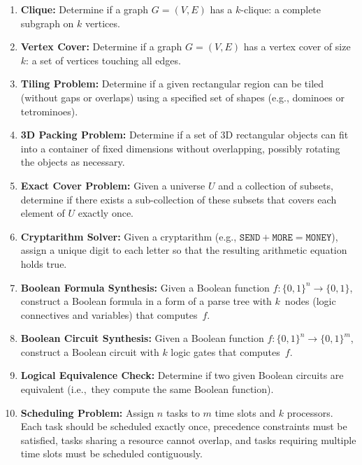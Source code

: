\documentclass[a4paper,12pt]{article}
\begin{document}
\begin{tasks}
\begin{enumerate}[start=0]
        \item \textbf{Clique:}
        Determine if a graph $G = (V, E)$ has a $k$-clique: a complete subgraph on $k$ vertices.

        \item \textbf{Vertex Cover:}
        Determine if a graph $G = (V, E)$ has a vertex cover of size~$k$: a set of vertices touching all edges.

        \item \textbf{Tiling Problem:}
        Determine if a given rectangular region can be tiled (without gaps or overlaps) using a specified set of shapes (e.g., dominoes or tetrominoes).

        \item \textbf{3D Packing Problem:}
        Determine if a set of 3D rectangular objects can fit into a container of fixed dimensions without overlapping, possibly rotating the objects as necessary.

        \item \textbf{Exact Cover Problem:}
        Given a universe $U$ and a collection of subsets, determine if there exists a sub-collection of these subsets that covers each element of $U$ exactly once.

        \item \textbf{Cryptarithm Solver:}
        Given a cryptarithm (e.g., $\mathtt{SEND} + \mathtt{MORE} = \mathtt{MONEY}$), assign a unique digit to each letter so that the resulting arithmetic equation holds true.

        \item \textbf{Boolean Formula Synthesis:}
        Given a Boolean function $f: \{0,1\}^n \to \{0,1\}$, construct a Boolean formula in a form of a parse tree with $k$~nodes (logic connectives and variables) that computes~$f$.

        \item \textbf{Boolean Circuit Synthesis:}
        Given a Boolean function $f: \{0,1\}^n \to \{0,1\}^m$, construct a Boolean circuit with $k$ logic gates that computes~$f$.

        \item \textbf{Logical Equivalence Check:}
        Determine if two given Boolean circuits are equivalent (i.e.,~they compute the same Boolean function).

        \item \textbf{Scheduling Problem:}
        Assign $n$ tasks to $m$ time slots and $k$ processors. Each task should be scheduled exactly once, precedence constraints must be satisfied, tasks sharing a resource cannot overlap, and tasks requiring multiple time slots must be scheduled contiguously.


\end{enumerate}
\end{tasks}
\end{document}
